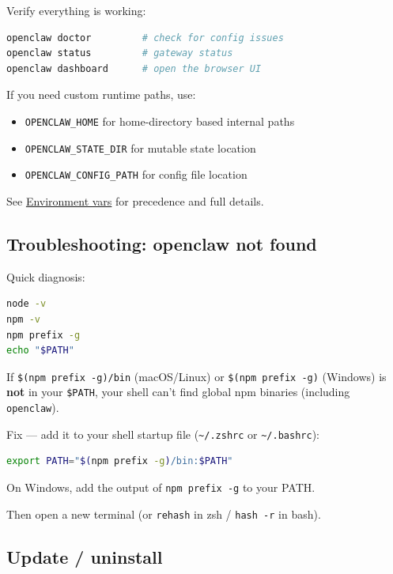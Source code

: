 Verify everything is working:

\begin{lstlisting}[language=bash]
openclaw doctor         # check for config issues
openclaw status         # gateway status
openclaw dashboard      # open the browser UI
\end{lstlisting}


If you need custom runtime paths, use:

\begin{itemize}
  \item \texttt{OPENCLAW\_HOME} for home-directory based internal paths
  \item \texttt{OPENCLAW\_STATE\_DIR} for mutable state location
  \item \texttt{OPENCLAW\_CONFIG\_PATH} for config file location
\end{itemize}


See \href{/help/environment}{Environment vars} for precedence and full details.

\subsection{Troubleshooting: openclaw not found}


Quick diagnosis:

\begin{lstlisting}[language=bash]
node -v
npm -v
npm prefix -g
echo "$PATH"
\end{lstlisting}


If \texttt{\$(npm prefix -g)/bin} (macOS/Linux) or \texttt{\$(npm prefix -g)} (Windows) is \textbf{not} in your \texttt{\$PATH}, your shell can't find global npm binaries (including \texttt{openclaw}).

Fix — add it to your shell startup file (\texttt{\textasciitilde{}/.zshrc} or \texttt{\textasciitilde{}/.bashrc}):

\begin{lstlisting}[language=bash]
export PATH="$(npm prefix -g)/bin:$PATH"
\end{lstlisting}


On Windows, add the output of \texttt{npm prefix -g} to your PATH.

Then open a new terminal (or \texttt{rehash} in zsh / \texttt{hash -r} in bash).

\subsection{Update / uninstall}


